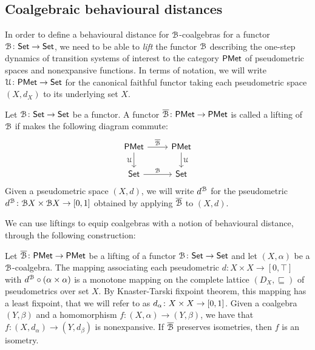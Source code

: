 \subsection{Coalgebraic behavioural distances}\label{c2:subsec:coalgebraic_behavioural_distances}
In order to define a behavioural distance for $\mathcal{B}$-coalgebras for a functor $\mathcal{B} \colon {\mathsf{Set}} \to {\mathsf{Set}}$, we need to be able to \emph{lift} the functor $\mathcal{B}$ describing the one-step dynamics of transition systems of interest to the category $\mathsf{PMet}$ of pseudometric spaces and nonexpansive functions. In terms of notation, we will write $\mathcal{U} \colon \mathsf{PMet} \to {\mathsf{Set}}$ for the canonical faithful functor taking each pseudometric space $(X, d_X)$ to its underlying set $X$.
\begin{definition}\label{c2:def:lifting}
	Let $\mathcal{B} \colon {\mathsf{Set}} \to {\mathsf{Set}}$ be a functor. A functor $\overline{\mathcal{B}} \colon \mathsf{PMet} \to \mathsf{PMet}$ is called a lifting of $\mathcal{B}$ if makes the following diagram commute:
\[\begin{tikzcd}
	\PMet & \PMet \\
	\Set & \Set
	\arrow["{\overline{\funB}}", from=1-1, to=1-2]
	\arrow["\forget"', from=1-1, to=2-1]
	\arrow["\forget", from=1-2, to=2-2]
	\arrow["\funB", from=2-1, to=2-2]
\end{tikzcd}\]
Given a pseudometric space $(X, d)$, we will write $d^{\mathcal{B}}$ for the pseudometric $d^{\funB} \colon \funB X \times \funB X \to \interval{0}{1}$ obtained by applying $\overline{\mathcal{B}}$ to $(X,d)$.
\end{definition}
We can use liftings to equip coalgebras with a notion of behavioural distance, through the following construction:
\begin{lemma}\label{c2:lem:behavioural_distances}
	Let $\overline{\mathcal{B}} \colon \mathsf{PMet} \to \mathsf{PMet}$ be a lifting of a functor $\mathcal{B} \colon {\mathsf{Set}} \to {\mathsf{Set}}$ and let $(X, \alpha)$ be a $\mathcal{B}$-coalgebra. The mapping associating each pseudometric $d \colon X \times X \to [0,\top]$ with $d^{\mathcal{B}} \circ (\alpha \times \alpha)$ is a monotone mapping on the complete lattice $(D_X, \sqsubseteq)$ of pseudometrics over set $X$. By Knaster-Tarski fixpoint theorem, this mapping has a least fixpoint, that we will refer to as $d_\alpha \colon X \times X \to \interval{0}{1}$. Given a coalgebra $(Y, \beta)$ and a homomorphism $f \colon (X, \alpha) \to (Y, \beta)$, we have that $f \colon (X, d_\alpha) \to (Y, d_\beta)$ is nonexpansive. If $\overline{\mathcal{B}}$ preserves isometries, then $f$ is an isometry.
\end{lemma}
